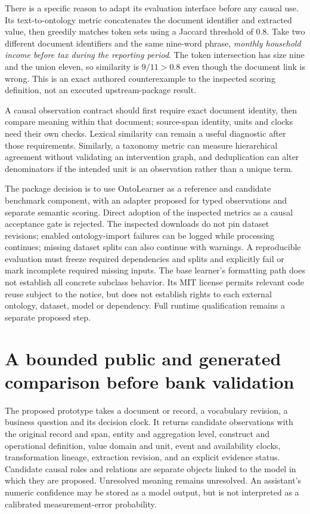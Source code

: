 There is a specific reason to adapt its evaluation interface before any
causal use. Its text-to-ontology metric concatenates the document identifier
and extracted value, then greedily matches token sets using a Jaccard
threshold of \(0.8\). Take two different document identifiers and the
same nine-word phrase, \emph{monthly household income before tax during the
reporting period}. The token intersection has size nine and the union
eleven, so similarity is \(9/11>0.8\) even though the document link is wrong.
This is an exact authored counterexample to the inspected scoring
definition, not an executed upstream-package result.
\citep{exec17_ontology_sources,exec17_ontology_oracle}

A causal observation contract should first require exact document identity,
then compare meaning within that document; source-span identity, units and
clocks need their own checks. Lexical similarity can remain a useful
diagnostic after those requirements. Similarly, a taxonomy metric can measure
hierarchical agreement without validating an intervention graph, and
deduplication can alter denominators if the intended unit is an observation
rather than a unique term.

The package decision is to use OntoLearner as a reference and candidate
benchmark component, with an adapter proposed for typed observations and
separate semantic scoring. Direct adoption of the inspected metrics as a
causal acceptance gate is rejected. The inspected downloads do not pin
dataset revisions; enabled ontology-import failures can be logged while
processing continues; missing dataset splits can also continue with warnings.
A reproducible evaluation must freeze required dependencies and splits and
explicitly fail or mark incomplete required missing inputs. The base
learner's formatting path does not establish all concrete subclass behavior.
Its MIT license permits relevant code reuse subject to the notice, but does
not establish rights to each external ontology, dataset, model or dependency.
Full runtime qualification remains a separate proposed step.
\citep{exec17_ontology_sources}

\section{A bounded public and generated comparison before bank validation}

The proposed prototype takes a document or record, a vocabulary revision, a
business question and its decision clock. It returns candidate observations
with the original record and span, entity and aggregation level, construct and
operational definition, value domain and unit, event and availability clocks,
transformation lineage, extraction revision, and an explicit evidence status.
Candidate causal roles and relations are separate objects linked to the
model in which they are proposed. Unresolved meaning remains unresolved.
An assistant's numeric confidence may be stored as a model output, but is
not interpreted as a calibrated measurement-error probability.
\citep{exec17_ontology_contract}

